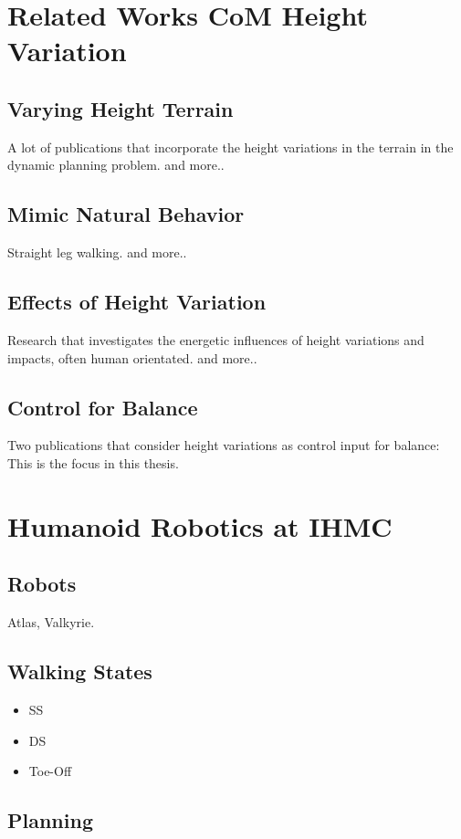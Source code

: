 \section{Related Works CoM Height Variation}
\subsection{Varying Height Terrain}
A lot of publications that incorporate the height variations in the terrain in the dynamic planning problem.
\cite{englsberger2013three} \cite{hopkins2014humanoid} and more..
\subsection{Mimic Natural Behavior}
Straight leg walking.
\cite{griffin2018straight} and more..
\subsection{Effects of Height Variation}
Research that investigates the energetic influences of height variations and impacts, often human orientated.
\cite{kuo2005energetic} \cite{lee1998determinants} \cite{gao2017increase} and more..
\subsection{Control for Balance}
Two publications that consider height variations as control input for balance:
\cite{koolen2016balance} \cite{caron2018capturability}
This is the focus in this thesis.

\section{Humanoid Robotics at IHMC}
\subsection{Robots}
Atlas, Valkyrie.
\subsection{Walking States}
\begin{itemize}
	\item \ac{SS}
	\item \ac{DS}
	\item Toe-Off
\end{itemize}
\subsection{Planning}
